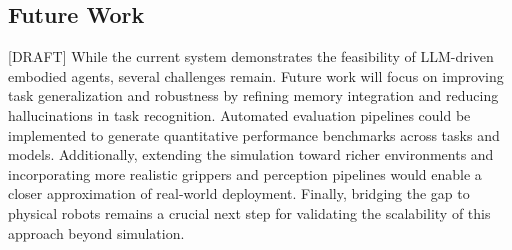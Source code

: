 \documentclass[../report.tex]{subfiles}
\begin{document}
\subsection{Future Work}
\label{sec:conclusions:future_work}
[DRAFT]
While the current system demonstrates the feasibility of LLM-driven embodied agents, several challenges remain. Future work will focus on improving task generalization and robustness by refining memory integration and reducing hallucinations in task recognition. Automated evaluation pipelines could be implemented to generate quantitative performance benchmarks across tasks and models. Additionally, extending the simulation toward richer environments and incorporating more realistic grippers and perception pipelines would enable a closer approximation of real-world deployment. Finally, bridging the gap to physical robots remains a crucial next step for validating the scalability of this approach beyond simulation.
\end{document}
